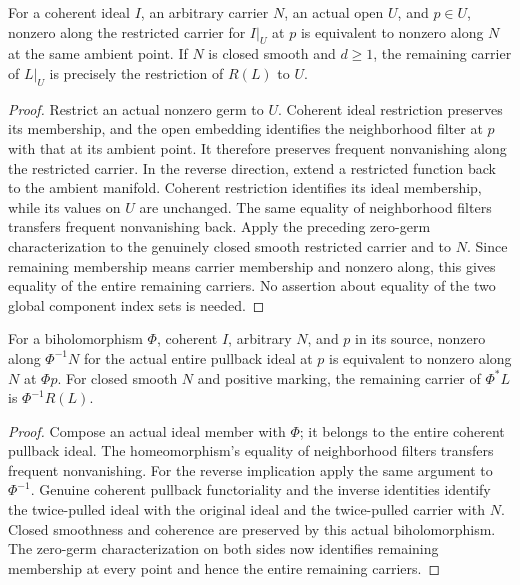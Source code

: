 \begin{theorem}
\label{hir:zero-contact-selected-open-dictionary}
\leanok
{}
For a coherent ideal $I$, an arbitrary carrier $N$, an actual open $U$,
and $p\in U$, nonzero along the restricted carrier for $I|_U$ at $p$
is equivalent to nonzero along $N$ at the same ambient point. If $N$ is
closed smooth and $d\geq1$, the remaining carrier of $L|_U$ is precisely
the restriction of $R(L)$ to $U$.
\end{theorem}
\begin{proof}
Restrict an actual nonzero germ to $U$. Coherent ideal restriction preserves
its membership, and the open embedding identifies the neighborhood filter
at $p$ with that at its ambient point. It therefore preserves frequent
nonvanishing along the restricted carrier. In the reverse direction,
extend a restricted function back to the ambient manifold. Coherent
restriction identifies its ideal membership, while its values on $U$
are unchanged. The same equality of neighborhood filters transfers
frequent nonvanishing back. Apply the preceding zero-germ characterization
to the genuinely closed smooth restricted carrier and to $N$. Since
remaining membership means carrier membership and nonzero along, this
gives equality of the entire remaining carriers. No assertion about
equality of the two global component index sets is needed.
\end{proof}

\begin{theorem}
\label{hir:zero-contact-selected-biholomorphic-dictionary}
\leanok
{}
For a biholomorphism $\Phi$, coherent $I$, arbitrary $N$, and $p$ in its
source, nonzero along $\Phi^{-1}N$ for the actual entire pullback ideal
at $p$ is equivalent to nonzero along $N$ at $\Phi p$. For closed smooth
$N$ and positive marking, the remaining carrier of $\Phi^*L$ is
$\Phi^{-1}R(L)$.
\end{theorem}
\begin{proof}
Compose an actual ideal member with $\Phi$; it belongs to the entire
coherent pullback ideal. The homeomorphism's equality of neighborhood
filters transfers frequent nonvanishing. For the reverse implication
apply the same argument to $\Phi^{-1}$. Genuine coherent pullback
functoriality and the inverse identities identify the twice-pulled ideal
with the original ideal and the twice-pulled carrier with $N$. Closed
smoothness and coherence are preserved by this actual biholomorphism.
The zero-germ characterization on both sides now identifies remaining
membership at every point and hence the entire remaining carriers.
\end{proof}

